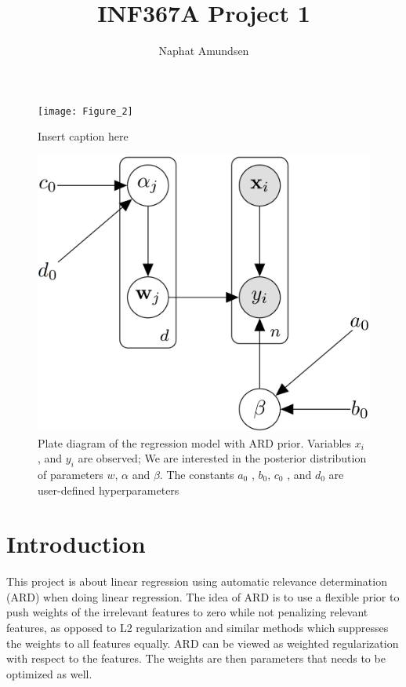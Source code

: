 \documentclass[12pt]{article}
\begin{document}
\title{\textbf{INF367A Project 1}}
\author{Naphat Amundsen}
\maketitle
\sectionfont{\fontsize{14}{15}\selectfont}
\subsectionfont{\fontsize{12}{15}\selectfont}
\subsubsectionfont{\fontsize{12}{15}\selectfont}
\graphicspath{ {./images/} }

\ifx
\begin{figure}[H]
	\centering
	\texttt{[image: Figure\_2]}
	\caption{Insert caption here}
\end{figure}
\fi
\ifx
\begin{figure}[H]
	\centering
	\includegraphics[scale=0.8]{bn_network.png}
	\caption{Plate diagram of the regression model with ARD prior. Variables $x_i$ , and $y_i$ are observed; We are interested in the posterior distribution of parameters $w$, $\alpha$ and $\beta$. The constants $a_0$ , $b_0$, $c_0$ , and $d_0$ are user-defined hyperparameters}
\end{figure}
\fi

\newcommand{\opGamma}{\operatorname{Gamma}}

\section*{Introduction}
    This project is about linear regression using automatic relevance determination (ARD) when doing linear regression. The idea of ARD is to use a flexible prior to push weights of the irrelevant features to zero while not penalizing relevant features, as opposed to L2 regularization and similar methods which suppresses the weights to all features equally. ARD can be viewed as weighted regularization with respect to the features. The weights are then parameters that needs to be optimized as well. 
\end{document}
